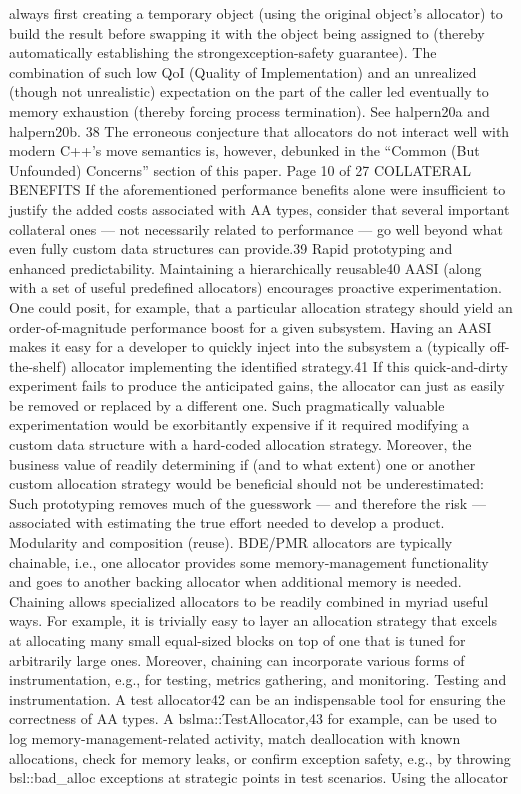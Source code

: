 always first creating a temporary object (using the original object’s allocator) to build the result before
swapping it with the object being assigned to (thereby automatically establishing the strongexception-safety guarantee). The combination of such low QoI (Quality of Implementation) and an
unrealized (though not unrealistic) expectation on the part of the caller led eventually to memory
exhaustion (thereby forcing process termination). See halpern20a and halpern20b. 38 The erroneous conjecture that allocators do not interact well with modern C++’s move semantics is,
however, debunked in the “Common (But Unfounded) Concerns” section of this paper.
Page 10 of 27
COLLATERAL BENEFITS
If the aforementioned performance benefits alone were insufficient to justify the
added costs associated with AA types, consider that several important collateral ones
— not necessarily related to performance — go well beyond what even fully custom
data structures can provide.39
Rapid prototyping and enhanced predictability. Maintaining a hierarchically
reusable40 AASI (along with a set of useful predefined allocators) encourages
proactive experimentation. One could posit, for example, that a particular allocation
strategy should yield an order-of-magnitude performance boost for a given
subsystem. Having an AASI makes it easy for a developer to quickly inject into the
subsystem a (typically off-the-shelf) allocator implementing the identified strategy.41
If this quick-and-dirty experiment fails to produce the anticipated gains, the
allocator can just as easily be removed or replaced by a different one. Such
pragmatically valuable experimentation would be exorbitantly expensive if it
required modifying a custom data structure with a hard-coded allocation strategy.
Moreover, the business value of readily determining if (and to what extent) one or
another custom allocation strategy would be beneficial should not be
underestimated: Such prototyping removes much of the guesswork — and therefore
the risk — associated with estimating the true effort needed to develop a product.
Modularity and composition (reuse). BDE/PMR allocators are typically chainable,
i.e., one allocator provides some memory-management functionality and goes to
another backing allocator when additional memory is needed. Chaining allows
specialized allocators to be readily combined in myriad useful ways. For example, it
is trivially easy to layer an allocation strategy that excels at allocating many small
equal-sized blocks on top of one that is tuned for arbitrarily large ones. Moreover,
chaining can incorporate various forms of instrumentation, e.g., for testing, metrics
gathering, and monitoring.
Testing and instrumentation. A test allocator42 can be an indispensable tool for
ensuring the correctness of AA types. A bslma::TestAllocator,43 for example, can
be used to log memory-management-related activity, match deallocation with known
allocations, check for memory leaks, or confirm exception safety, e.g., by throwing
bsl::bad_alloc exceptions at strategic points in test scenarios. Using the allocator

